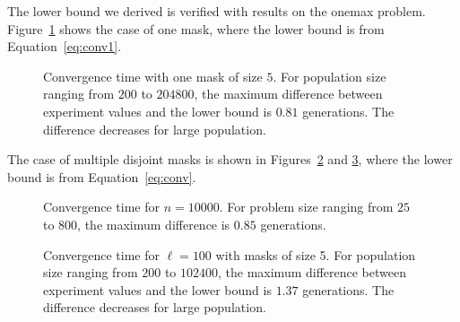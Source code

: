 \documentclass{sig-alternate}
\begin{document}
The lower bound we derived is verified with results on the onemax problem.
Figure~\ref{fig:conv1} shows the case of one mask, where the lower bound is from Equation~\ref{eq:conv1}.
\begin{figure}%
\centering
{}
\caption{
Convergence time with one mask of size $5$.
For population size ranging from $200$ to $204800$,
the maximum difference between experiment values and the lower bound is $0.81$ generations.
The difference decreases for large population.
}
\label{fig:conv1}
\end{figure}
The case of multiple disjoint masks is shown in Figures~\ref{fig:conv2} and \ref{fig:conv3},
where the lower bound is from Equation~\ref{eq:conv}.
\begin{figure}%
\centering
{}
\caption{
Convergence time for $n=10000$.
For problem size ranging from $25$ to $800$,
the maximum difference is $0.85$ generations.
}
\label{fig:conv2}
\end{figure}

\begin{figure}%
\centering
{}
\caption{
Convergence time for $\ell=100$ with masks of size 5.
For population size ranging from $200$ to $102400$,
the maximum difference between experiment values and the lower bound is $1.37$ generations.
The difference decreases for large population.
}
\label{fig:conv3}
\end{figure}

\end{document}
